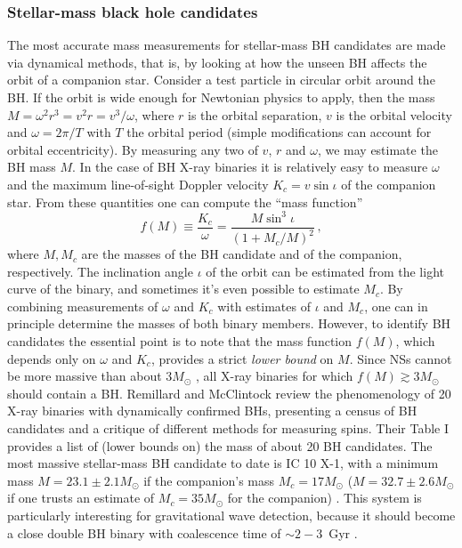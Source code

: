 \documentclass[]{iopart}
\def\be{\begin{equation}}
\def\ee{\end{equation}}
\def\f{\frac}
\def\f{\frac}
\begin{document}
\subsubsection*{Stellar-mass black hole candidates} 

The most accurate mass measurements for stellar-mass BH candidates are made
via dynamical methods, that is, by looking at how the unseen BH affects the
orbit of a companion star. Consider a test particle in circular orbit around
the BH. If the orbit is wide enough for Newtonian physics to apply, then the
mass $M=\omega^2 r^3=v^2r=v^3/\omega$, where $r$ is the orbital separation,
$v$ is the orbital velocity and $\omega=2\pi/T$ with $T$ the orbital period
(simple modifications can account for orbital eccentricity).  By measuring any
two of $v$, $r$ and $\omega$, we may estimate the BH mass $M$. In the case of
BH X-ray binaries it is relatively easy to measure $\omega$ and the maximum
line-of-sight Doppler velocity $K_c=v\sin \iota$ of the companion star. From
these quantities one can compute the ``mass function''
%
\be
f(M)\equiv\f{K_c}{\omega}=\f{M\sin^3\iota}{(1+M_c/M)^2}\,,
\ee
%
where $M,M_c$ are the masses of the BH candidate and of the companion,
respectively.  The inclination angle $\iota$ of the orbit can be estimated
from the light curve of the binary, and sometimes it's even possible to
estimate $M_c$. By combining measurements of $\omega$ and $K_c$ with estimates
of $\iota$ and $M_c$, one can in principle determine the masses of both binary
members. However, to identify BH candidates the essential point is to note
that the mass function $f(M)$, which depends only on $\omega$ and $K_c$,
provides a strict {\em lower bound} on $M$. Since NSs cannot be more massive
than about $3M_\odot$ \cite{Rhoades:1974fn}, all X-ray binaries for which
$f(M)\gtrsim 3M_\odot$ should contain a BH.  Remillard and McClintock
\cite{Remillard:2006fc} review the phenomenology of 20 X-ray binaries with
dynamically confirmed BHs, presenting a census of BH candidates and a critique
of different methods for measuring spins. Their Table I provides a list of
(lower bounds on) the mass of about 20 BH candidates. The most massive
stellar-mass BH candidate to date is IC 10 X-1, with a minimum mass $M=23.1\pm
2.1M_\odot$ if the companion's mass $M_c=17M_\odot$ ($M=32.7\pm 2.6M_\odot$ if
one trusts an estimate of $M_c=35M_\odot$ for the companion)
\cite{Silverman:2008ss}. This system is particularly interesting for
gravitational wave detection, because it should become a close double BH
binary with coalescence time of $\sim 2-3$~Gyr \cite{Bulik:2008ab}.
\end{document}
